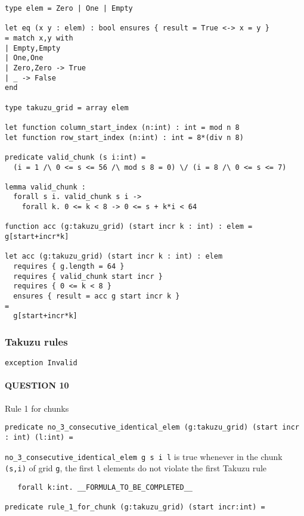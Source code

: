 \begin{verbatim}
type elem = Zero | One | Empty

let eq (x y : elem) : bool ensures { result = True <-> x = y }
= match x,y with
| Empty,Empty
| One,One
| Zero,Zero -> True
| _ -> False
end

type takuzu_grid = array elem

let function column_start_index (n:int) : int = mod n 8
let function row_start_index (n:int) : int = 8*(div n 8)

predicate valid_chunk (s i:int) =
  (i = 1 /\ 0 <= s <= 56 /\ mod s 8 = 0) \/ (i = 8 /\ 0 <= s <= 7)

lemma valid_chunk :
  forall s i. valid_chunk s i ->
    forall k. 0 <= k < 8 -> 0 <= s + k*i < 64

function acc (g:takuzu_grid) (start incr k : int) : elem = g[start+incr*k]

let acc (g:takuzu_grid) (start incr k : int) : elem
  requires { g.length = 64 }
  requires { valid_chunk start incr }
  requires { 0 <= k < 8 }
  ensures { result = acc g start incr k }
=
  g[start+incr*k]
\end{verbatim}

\hypertarget{takuzu-rules}{%
\subsubsection{Takuzu rules}\label{takuzu-rules}}

\begin{verbatim}
exception Invalid
\end{verbatim}

\hypertarget{question-10}{%
\paragraph{QUESTION 10}\label{question-10}}

Rule 1 for chunks

\begin{verbatim}
predicate no_3_consecutive_identical_elem (g:takuzu_grid) (start incr : int) (l:int) =
\end{verbatim}

\texttt{no\_3\_consecutive\_identical\_elem\ g\ s\ i\ l} is true
whenever in the chunk \texttt{(s,i)} of grid \texttt{g}, the first
\texttt{l} elements do not violate the first Takuzu rule

\begin{verbatim}
   forall k:int. __FORMULA_TO_BE_COMPLETED__

predicate rule_1_for_chunk (g:takuzu_grid) (start incr:int) =
\end{verbatim}

